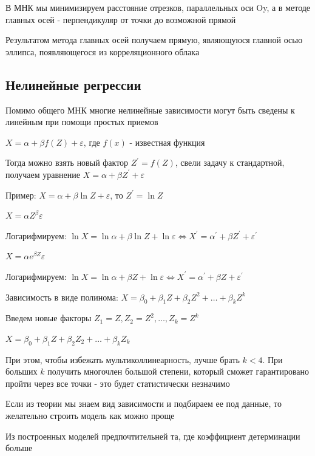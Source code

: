 \documentclass[12pt]{article}
\begin{document}
В МНК мы минимизируем расстояние отрезков, параллельных оси Oy, а в методе главных осей - перпендикуляр от точки до возможной прямой

Результатом метода главных осей получаем прямую, являющуюся главной осью эллипса, появляющегося из корреляционного облака

\subsection{Нелинейные регрессии}

Помимо общего МНК многие нелинейные зависимости могут быть сведены к линейным при помощи простых приемов

 $X = \alpha + \beta f(Z) + \varepsilon$, где $f(x)$ - известная функция

Тогда можно взять новый фактор $Z^\prime = f(Z)$, свели задачу к стандартной, получаем уравнение $X = \alpha + \beta Z^\prime + \varepsilon$

Пример: $X = \alpha + \beta \ln Z + \varepsilon$, то $Z^\prime = \ln Z$

 $X = \alpha Z^\beta \varepsilon$

Логарифмируем: $\ln X = \ln \alpha + \beta \ln Z + \ln \varepsilon \Longleftrightarrow X^\prime = \alpha^\prime + \beta Z^\prime + \varepsilon^\prime$

 $X = \alpha e^{\beta Z} \varepsilon$

Логарифмируем: $\ln X = \ln \alpha + \beta Z + \ln \varepsilon \Longleftrightarrow X^\prime = \alpha^\prime + \beta Z + \varepsilon^\prime$

 Зависимость в виде полинома: $X = \beta_0 + \beta_1 Z + \beta_2 Z^2 + \dots + \beta_k Z^k$

Введем новые факторы $Z_1 = Z, Z_2 = Z^2, \dots, Z_k = Z^k$

$X = \beta_0 + \beta_1 Z + \beta_2 Z_2 + \dots + \beta_k Z_k$

При этом, чтобы избежать мультиколлинеарность, лучше брать $k < 4$. При больших $k$ получить многочлен большой степени, который сможет гарантировано пройти через все точки - это будет статистически незначимо


\Nota Если из теории мы знаем вид зависимости и подбираем ее под данные, то желательно строить модель как можно проще

\Notas Из построенных моделей предпочтительней та, где коэффициент детерминации больше

\mediumvspace
\end{document}
